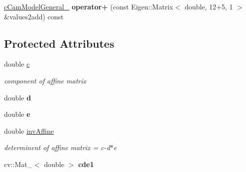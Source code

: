 \begin{DoxyCompactItemize}
\item 
\hyperlink{classMultiColSLAM_1_1cCamModelGeneral__}{c\+Cam\+Model\+General\+\_\+} {\bfseries operator+} (const Eigen\+::\+Matrix$<$ double, 12+5, 1 $>$ \&values2add) const \hypertarget{classMultiColSLAM_1_1cCamModelGeneral___ae46a62f84b9f3a1d7b567de9595e9942}{}\label{classMultiColSLAM_1_1cCamModelGeneral___ae46a62f84b9f3a1d7b567de9595e9942}

\end{DoxyCompactItemize}
\subsection*{Protected Attributes}
\begin{DoxyCompactItemize}
\item 
double \hyperlink{classMultiColSLAM_1_1cCamModelGeneral___af87c74bdf9d466f5ace1414d1e087b12}{c}\hypertarget{classMultiColSLAM_1_1cCamModelGeneral___af87c74bdf9d466f5ace1414d1e087b12}{}\label{classMultiColSLAM_1_1cCamModelGeneral___af87c74bdf9d466f5ace1414d1e087b12}

\begin{DoxyCompactList}\small\item\em component of affine matrix \end{DoxyCompactList}\item 
double {\bfseries d}\hypertarget{classMultiColSLAM_1_1cCamModelGeneral___aeec98783aaef10152bc7f8a1aab44508}{}\label{classMultiColSLAM_1_1cCamModelGeneral___aeec98783aaef10152bc7f8a1aab44508}

\item 
double {\bfseries e}\hypertarget{classMultiColSLAM_1_1cCamModelGeneral___a7e35fdb20bb2cb49810b52cdc52a5ab5}{}\label{classMultiColSLAM_1_1cCamModelGeneral___a7e35fdb20bb2cb49810b52cdc52a5ab5}

\item 
double \hyperlink{classMultiColSLAM_1_1cCamModelGeneral___adc18b74a064d4cfbf41c2932d21fd5e9}{inv\+Affine}\hypertarget{classMultiColSLAM_1_1cCamModelGeneral___adc18b74a064d4cfbf41c2932d21fd5e9}{}\label{classMultiColSLAM_1_1cCamModelGeneral___adc18b74a064d4cfbf41c2932d21fd5e9}

\begin{DoxyCompactList}\small\item\em determinent of affine matrix = c-\/d$\ast$e \end{DoxyCompactList}\item 
cv\+::\+Mat\+\_\+$<$ double $>$ {\bfseries cde1}\hypertarget{classMultiColSLAM_1_1cCamModelGeneral___a0268481118b8ab349b890a89ef64a15e}{}\label{classMultiColSLAM_1_1cCamModelGeneral___a0268481118b8ab349b890a89ef64a15e}


\end{DoxyCompactItemize}
